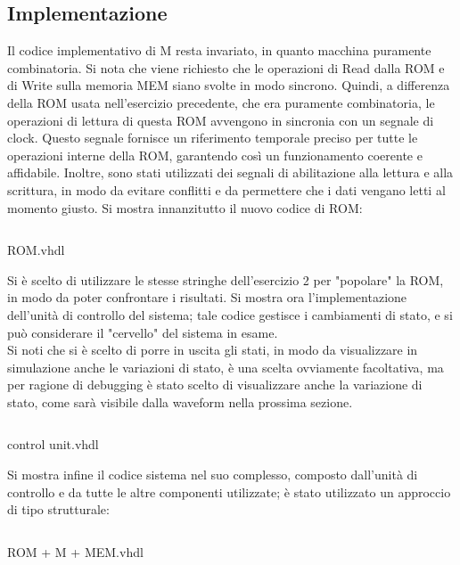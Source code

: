 \subsection{Implementazione}
Il codice implementativo di M resta invariato, in quanto macchina puramente combinatoria. Si nota che viene richiesto che le operazioni di Read dalla ROM e di Write sulla memoria MEM siano svolte in modo sincrono. Quindi, a differenza della ROM usata nell'esercizio precedente, che era puramente combinatoria, le operazioni di lettura di questa ROM avvengono in sincronia con un segnale di clock. Questo segnale fornisce un riferimento temporale preciso per tutte le operazioni interne della ROM, garantendo così un funzionamento coerente e affidabile. Inoltre, sono stati utilizzati dei segnali di abilitazione alla lettura e alla scrittura, in modo da evitare conflitti e da permettere che i dati vengano letti al momento giusto. 
Si mostra innanzitutto il nuovo codice di ROM:
\begin{code}
    \inputminted[frame=lines, framesep=2mm, baselinestretch=1.2, bgcolor=LightGray, fontsize=\footnotesize, linenos]{vhdl}{vhdl_files/ROM_MEM_M/ROMconCLOCK.vhd}
    \caption{ROM.vhdl}
    \label{lbl:ROMC}
\end{code}
Si è scelto di utilizzare le stesse stringhe dell'esercizio 2 per "popolare" la ROM, in modo da poter confrontare i risultati.
Si mostra ora l'implementazione dell'unità di controllo del sistema; tale codice gestisce i cambiamenti di stato, e si può considerare il "cervello" del sistema in esame. \\
Si noti che si è scelto di porre in uscita gli stati, in modo da visualizzare in simulazione anche le variazioni di stato, è una scelta ovviamente facoltativa, ma per ragione di debugging è stato scelto di visualizzare anche la variazione di stato, come sarà visibile dalla waveform nella prossima sezione.
\begin{code}
    \inputminted[frame=lines, framesep=2mm, baselinestretch=1.2, bgcolor=LightGray, fontsize=\footnotesize, linenos]{vhdl}{vhdl_files/ROM_MEM_M/control_unit.vhd}
    \caption{control unit.vhdl}
    \label{lbl:ROMC}
\end{code}
Si mostra infine il codice sistema nel suo complesso, composto dall'unità di controllo e da tutte le altre componenti utilizzate; è stato utilizzato un approccio di tipo strutturale:
\begin{code}
    \inputminted[frame=lines, framesep=2mm, baselinestretch=1.2, bgcolor=LightGray, fontsize=\footnotesize, linenos]{vhdl}{vhdl_files/ROM_MEM_M/ROM_M_MEMO.vhd}
    \caption{ROM + M + MEM.vhdl}
    \label{lbl:ROMC}
\end{code}
